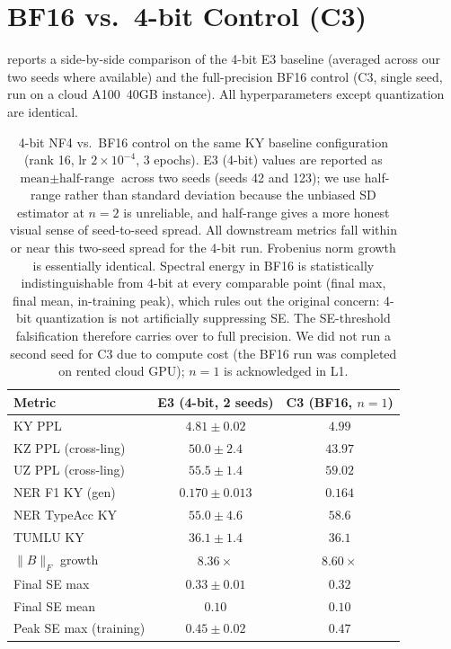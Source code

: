 \documentclass[11pt]{article}
\begin{document}
\section{BF16 vs.\ 4-bit Control (C3)}
\label{app:bf16}

 reports a side-by-side comparison of the 4-bit E3 baseline (averaged across our two seeds where available) and the full-precision BF16 control (C3, single seed, run on a cloud A100~40GB instance). All hyperparameters except quantization are identical.

\begin{table}[t]
\centering
\small
\begin{tabular}{lcc}
\toprule
\textbf{Metric} & \textbf{E3 (4-bit, 2 seeds)} & \textbf{C3 (BF16, $n{=}1$)} \\
\midrule
KY PPL              & $4.81 \pm 0.02$    & $4.99$ \\
KZ PPL (cross-ling) & $50.0 \pm 2.4$     & $43.97$ \\
UZ PPL (cross-ling) & $55.5 \pm 1.4$     & $59.02$ \\
NER F1 KY (gen)     & $0.170 \pm 0.013$  & $0.164$ \\
NER TypeAcc KY      & $55.0 \pm 4.6$     & $58.6$ \\
TUMLU KY            & $36.1 \pm 1.4$     & $36.1$ \\
$\|B\|_F$ growth    & $8.36\times$       & $8.60\times$ \\
Final SE max        & $0.33 \pm 0.01$    & $0.32$ \\
Final SE mean       & $0.10$             & $0.10$ \\
Peak SE max (training) & $0.45 \pm 0.02$ & $0.47$ \\
\bottomrule
\end{tabular}
\caption{4-bit NF4 vs.\ BF16 control on the same KY baseline configuration (rank 16, lr $2{\times}10^{-4}$, 3 epochs). E3 (4-bit) values are reported as $\text{mean} \pm \text{half-range}$ across two seeds (seeds 42 and 123); we use half-range rather than standard deviation because the unbiased SD estimator at $n{=}2$ is unreliable, and half-range gives a more honest visual sense of seed-to-seed spread. All downstream metrics fall within or near this two-seed spread for the 4-bit run. Frobenius norm growth is essentially identical. Spectral energy in BF16 is statistically indistinguishable from 4-bit at every comparable point (final max, final mean, in-training peak), which rules out the original concern: 4-bit quantization is not artificially suppressing SE. The SE-threshold falsification therefore carries over to full precision. We did not run a second seed for C3 due to compute cost (the BF16 run was completed on rented cloud GPU); $n{=}1$ is acknowledged in L1.}
\label{tab:bf16}
\end{table}
\end{document}
